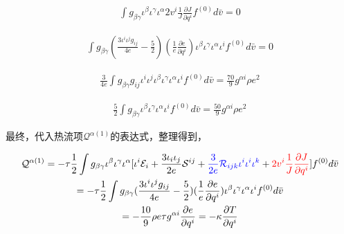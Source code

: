 \documentclass[LBMDerivation.tex]{subfiles}
\begin{document}
\begin{equation}
  \begin{gathered}
    \int g_{\beta\gamma} \iota^{\beta} \iota^{\gamma} \iota^{\alpha} 2v^i  \frac{1}{J}\frac{\partial J}{\partial q^i}  f^{(0)} d \bar{v} = 0
  \end{gathered}
\end{equation}



\begin{equation}
  \begin{gathered}
    \int g_{\beta\gamma} (\frac{3 {\iota^i\iota^jg_{ij}}}{4e}-\frac{5}{2}) (\frac{1}{e}\frac{\partial e}{\partial q^i})\iota^{\beta} \iota^{\gamma}  \iota^{\alpha} \iota^i   f^{(0)}  d \bar{v} =0
  \end{gathered}
\end{equation}





\begin{equation}
  \begin{gathered}
    \frac{3}{4e}\int g_{\beta\gamma} g_{ij} \iota^i\iota^j\iota^{\beta} \iota^{\gamma}  \iota^{\alpha} \iota^i   f^{(0)}  d \bar{v} =\frac{70}{9}g^{\alpha i}\rho e^2
  \end{gathered}
\end{equation}


\begin{equation}
  \begin{gathered}
    \frac{5}{2} \int g_{\beta\gamma} \iota^{\beta} \iota^{\gamma}  \iota^{\alpha} \iota^i   f^{(0)}  d \bar{v} =\frac{50}{9}g^{\alpha i}\rho e^2
  \end{gathered}
\end{equation}





最终，代入热流项$\mathcal{Q}^{\alpha (1)}$的表达式，整理得到，


\begin{equation}
  \begin{gathered}
    \mathcal{Q}^{\alpha (1)}
    = -\tau  \frac{1}{2}\int g_{\beta\gamma} \iota^{\beta} \iota^{\gamma}  \iota^{\alpha}  [\iota^i\mathcal{E}_i
    +\frac{3\iota_i \iota_j}{2e} \mathcal{S}^{ij}
    + {\color{blue} \frac{3}{2e} \mathcal{R}_{ijk} \iota^i\iota^i\iota^k} + {\color{red} 2v^i  \frac{1}{J}\frac{\partial J}{\partial q^i}}
    ]{f^{(0)}} d \bar{v} \\
    = -\tau  \frac{1}{2} \int g_{\beta\gamma} (\frac{3 {\iota^i\iota^jg_{ij}}}{4e}-\frac{5}{2}) (\frac{1}{e}\frac{\partial e}{\partial q^i})\iota^{\beta} \iota^{\gamma}  \iota^{\alpha} \iota^i   f^{(0)}  d \bar{v} \\
    = -\frac{10}{9}\rho e \tau g^{\alpha i}\frac{\partial e}{\partial q^i} = -\kappa \frac{\partial T}{\partial q^i} 
  \end{gathered}
\end{equation}
\end{document}
